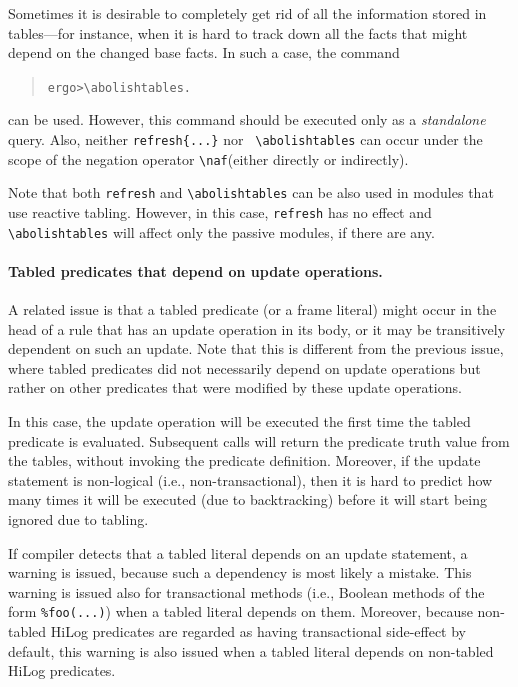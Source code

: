 \documentclass[11pt]{article}
\newcommand{\FLORA}{{\mbox{\smaller{\sc ${\cal F}${lora}\rm\emph{-2}}}}\xspace}
\newcommand{\ERGO}{\mbox{\smaller{\ensuremath{\cal{E}}\smaller{{\sc{RGO}}}}}\xspace}
\newcommand{\FLSYSTEM}{\ERGO}
\newcommand{\prompt}{ergo> }
\newcommand{\bs}{\textbackslash}
\newcommand{\RULELOGNAF}{{\texttt{{\bs}naf}}\xspace}
\begin{document}
\index{\bs{}abolishtables}
Sometimes it is desirable to completely get rid of all the information
stored in tables---for instance, when it is hard to track down all the facts
that might depend on the changed base facts. In such a case, the command
\begin{quote}
\begin{alltt}
\prompt \bs{}abolishtables.
\end{alltt}
\end{quote}
can be used. However, this command should be executed only as
a \emph{standalone} query.
Also, neither {\tt refresh\{...\}} nor {\tt
  \bs{}abolishtables} can occur under the scope of the
negation operator  \RULELOGNAF (either directly or indirectly).

Note that both \texttt{refresh} and \texttt{\bs{}abolishtables} can be also
used in modules that use reactive tabling. However, in this case,
\texttt{refresh} has no effect and \texttt{\bs{}abolishtables} will affect only
the passive modules, if there are any.

\paragraph{Tabled predicates that depend on update operations.}
\label{page-depchk}
A related issue is that a tabled predicate (or a frame literal)
might occur in the head of a rule that has an update operation in its body,
or it may be transitively dependent on such an update. Note that this is
different from the previous issue, where tabled predicates did not
necessarily depend on update operations but rather on other predicates that
were modified by these update operations.

In this case, the update operation will be executed the first time the
tabled predicate is evaluated. Subsequent calls will return the predicate truth
value from the tables, without invoking the predicate definition.
Moreover, if the update statement is non-logical (i.e.,
non-transactional), then it is hard to predict how many times it will be
executed (due to backtracking) before it will start being ignored due to
tabling.

If \FLSYSTEM compiler detects that a tabled literal depends on an update
statement, a warning is issued, because such a dependency is most likely a
mistake. This warning is issued also for transactional methods (i.e.,
Boolean methods of the form {\tt \%foo(...)}) when a tabled literal depends
on them. Moreover, because non-tabled HiLog predicates are regarded as having
transactional side-effect by default, this warning is also issued when a
tabled literal depends on non-tabled HiLog predicates.
\end{document}
